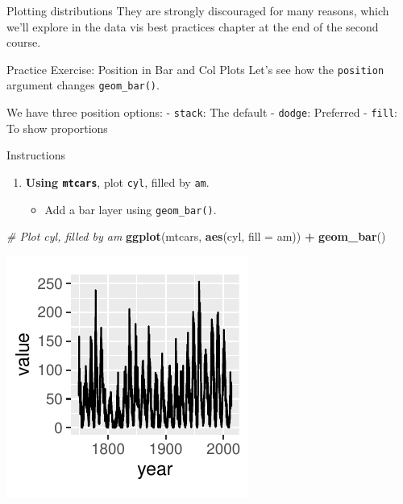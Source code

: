 \documentclass[
  ignorenonframetext,
]{beamer}
\newenvironment{Shaded}{\begin{snugshade}}{\end{snugshade}}
\newcommand{\AttributeTok}[1]{\textcolor[rgb]{0.13,0.29,0.53}{#1}}
\newcommand{\CommentTok}[1]{\textcolor[rgb]{0.56,0.35,0.01}{\textit{#1}}}
\newcommand{\FunctionTok}[1]{\textcolor[rgb]{0.13,0.29,0.53}{\textbf{#1}}}
\newcommand{\NormalTok}[1]{#1}
\newcommand{\SpecialCharTok}[1]{\textcolor[rgb]{0.81,0.36,0.00}{\textbf{#1}}}
\providecommand{\tightlist}{%
  \setlength{\itemsep}{0pt}\setlength{\parskip}{0pt}}
\begin{document}
\begin{frame}{Plotting distributions}
\label{plotting-distributions-3}
They are strongly discouraged for many reasons, which we'll explore in
the data vis best practices chapter at the end of the second course.
\end{frame}

\begin{frame}[fragile]{Practice Exercise: Position in Bar and Col Plots}
\label{practice-exercise-position-in-bar-and-col-plots}
Let's see how the \texttt{position} argument changes
\texttt{geom\_bar()}.

We have three position options: - \texttt{stack}: The default -
\texttt{dodge}: Preferred - \texttt{fill}: To show proportions
\end{frame}

\begin{frame}[fragile]{Instructions}
\label{instructions}
\begin{enumerate}
\tightlist
\item
  \textbf{Using \texttt{mtcars}}, plot \texttt{cyl}, filled by
  \texttt{am}.

  \begin{itemize}
  \tightlist
  \item
    Add a bar layer using \texttt{geom\_bar()}.
  \end{itemize}
\end{enumerate}

\begin{Shaded}
\begin{Highlighting}[]
\CommentTok{\# Plot cyl, filled by am}
\FunctionTok{ggplot}\NormalTok{(mtcars, }\FunctionTok{aes}\NormalTok{(cyl, }\AttributeTok{fill =}\NormalTok{ am)) }\SpecialCharTok{+} \FunctionTok{geom\_bar}\NormalTok{()}
\end{Highlighting}
\end{Shaded}

\begin{center}\includegraphics[width=0.5\linewidth]{Figs/unnamed-chunk-44-1} \end{center}
\end{frame}
\end{document}
